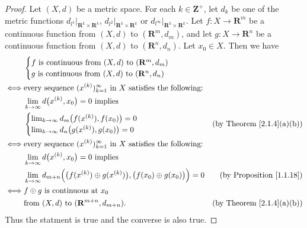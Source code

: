 \begin{proof}
    Let \((X, d)\) be a metric space.
    For each \(k \in \mathbf{Z}^+\), let \(d_k\) be one of the metric functions \(d_{l^1}|_{\mathbf{R}^k \times \mathbf{R}^k}\), \(d_{l^2}|_{\mathbf{R}^k \times \mathbf{R}^k}\) or \(d_{l^\infty}|_{\mathbf{R}^k \times \mathbf{R}^k}\).
    Let \(f : X \to \mathbf{R}^m\) be a continuous function from \((X, d)\) to \((\mathbf{R}^m, d_m)\), and let \(g : X \to \mathbf{R}^n\) be a continuous function from \((X, d)\) to \((\mathbf{R}^n, d_n)\).
    Let \(x_0 \in X\).
    Then we have
    \begin{align*}
             & \begin{cases}
                   f \text{ is continuous from } (X, d) \text{ to } (\mathbf{R}^m, d_m) \\
                   g \text{ is continuous from } (X, d) \text{ to } (\mathbf{R}^n, d_n)
               \end{cases}                                                                                      \\
        \iff & \text{every sequence } (x^{(k)})_{k = 1}^\infty \text{ in } X \text{ satisfies the following:}                                                            \\
             & \lim_{k \to \infty} d\big(x^{(k)}, x_0\big) = 0 \text{ implies }                                                                                          \\
             & \begin{cases}
                   \lim_{k \to \infty} d_m\big(f(x^{(k)}), f(x_0)\big) = 0 \\
                   \lim_{k \to \infty} d_n\big(g(x^{(k)}), g(x_0)\big) = 0
               \end{cases}                                                        & \text{(by Theorem \ref{2.1.4}(a)(b))}                                                \\
        \iff & \text{every sequence } (x^{(k)})_{k = 1}^\infty \text{ in } X \text{ satisfies the following:}                                                            \\
             & \lim_{k \to \infty} d\big(x^{(k)}, x_0\big) = 0 \text{ implies }                                                                                          \\
             & \lim_{k \to \infty} d_{m + n}\Big(\big(f(x^{(k)}) \oplus g(x^{(k)})\big), \big(f(x_0) \oplus g(x_0)\big)\Big) = 0 & \text{(by Proposition \ref{1.1.18})}  \\
        \iff & f \oplus g \text{ is continuous at } x_0                                                                                                                  \\
             & \text{from } (X, d) \text{ to } (\mathbf{R}^{m + n}, d_{m + n}).                                                  & \text{(by Theorem \ref{2.1.4}(a)(b))}
    \end{align*}
    Thus the statment is true and the converse is also true.
\end{proof}

